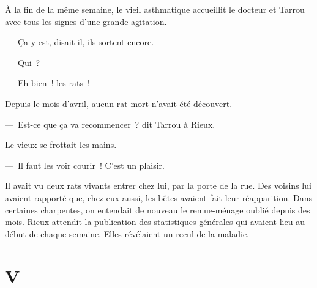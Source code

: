 \documentclass[french,twoside]{book} %
\newcommand\chapteropen{} %
\newcommand\chaptercont{} %
\newcommand\chapterclose{} %
\begin{document}
À la fin de la même semaine, le vieil asthmatique accueillit le docteur et Tarrou avec tous les signes d’une grande agitation.\par
— Ça y est, disait-il, ils sortent encore.\par
— Qui ?\par
— Eh bien ! les rats !\par
Depuis le mois d’avril, aucun rat mort n’avait été découvert.\par
— Est-ce que ça va recommencer ? dit Tarrou à Rieux.\par
Le vieux se frottait les mains.\par
— Il faut les voir courir ! C’est un plaisir.\par
Il avait vu deux rats vivants entrer chez lui, par la porte de la rue. Des voisins lui avaient rapporté que, chez eux aussi, les bêtes avaient fait leur réapparition. Dans certaines charpentes, on entendait de nouveau le remue-ménage oublié depuis des mois. Rieux attendit la publication des statistiques générales qui avaient lieu au début de chaque semaine. Elles révélaient un recul de la maladie.
\chapterclose


\chapteropen
\chapter[{V}]{V}\renewcommand{\leftmark}{V}


\chaptercont
\end{document}
